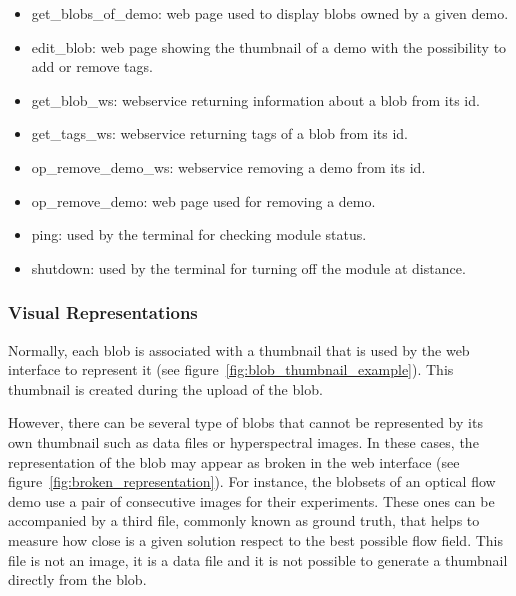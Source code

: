 \begin{itemize}
\item get\_blobs\_of\_demo: web page used to display blobs owned by a given demo.
\item edit\_blob: web page showing the thumbnail of a demo with the possibility to add or remove tags.
\item get\_blob\_ws: webservice returning information about a blob from its id.
\item get\_tags\_ws: webservice returning tags of a blob from its id.
\item op\_remove\_demo\_ws: webservice removing a demo from its id.
\item op\_remove\_demo: web page used for removing a demo.
\item ping: used by the terminal for checking module status.
\item shutdown: used by the terminal for turning off the module at distance.

\end{itemize}

\subsubsection{Visual Representations}

Normally, each blob is associated with a thumbnail that is used by the web interface to represent it (see figure~\ref{fig:blob_thumbnail_example}). This thumbnail is created during the upload of the blob.  

However, there can be several type of blobs that cannot be represented by its own thumbnail such as data files or hyperspectral images. In these cases, the representation of the blob may appear as broken in the web interface (see figure~\ref{fig:broken_representation}). For instance, the blobsets of an optical flow demo use a pair of consecutive images for their experiments. These ones can be accompanied by a third file, commonly known as ground truth, that helps to measure how close is a given solution respect to the best possible flow field. This file is not an image, it is a data file and it is not possible to generate a thumbnail directly from the blob. %
%

